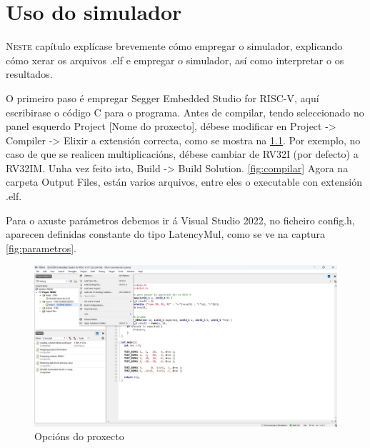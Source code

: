 \chapter{Uso do simulador}
\label{chap:uso_simulador}

\lettrine{N}{este} capítulo explícase brevemente cómo empregar o simulador, explicando cómo xerar os arquivos .elf e empregar o simulador, así como interpretar o os resultados. 

O primeiro paso é empregar Segger Embedded Studio for RISC-V, aquí escribirase o código C para o programa. Antes de compilar, tendo seleccionado no panel esquerdo Project [Nome do proxecto], débese modificar en Project -> Compiler -> Elixir a extensión correcta, como se mostra na \ref{fig:cap1}. Por exemplo, no caso de que se realicen multiplicacións, débese cambiar de RV32I (por defecto) a RV32IM. Unha vez feito isto,  Build -> Build Solution. \ref{fig:compilar}
Agora na carpeta Output Files, están varios arquivos, entre eles o executable con extensión .elf.

Para o axuste parámetros debemos ir á Visual Studio 2022, no ficheiro config.h, aparecen definidas constante do tipo LatencyMul, como se ve na captura \ref{fig:parametros}.

\begin{figure}[hp!]
  \centering
  \includegraphics[width=\textwidth]{imaxes/Cap_1.jpg}
  \caption{Opcións do proxecto}
  \label{fig:cap1}
\end{figure}

